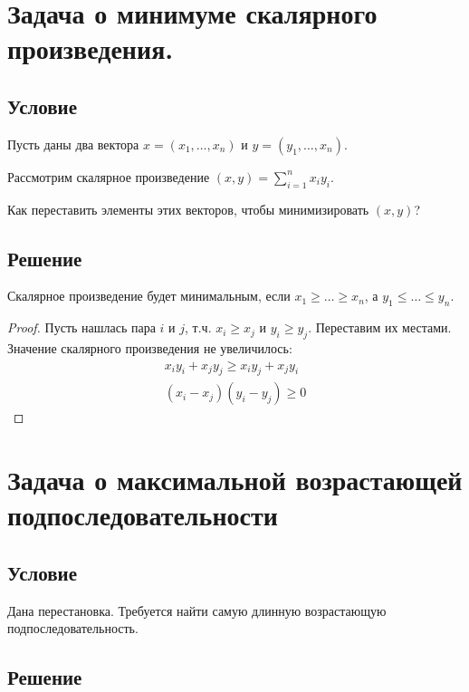 \documentclass[main]{subfiles}
\begin{document}
\section{Задача о минимуме скалярного произведения.}
\subsection{Условие}
Пусть даны два вектора $x = (x_1, \ldots, x_n)$ и $y = (y_1, \ldots, x_n)$.

Рассмотрим скалярное произведение $(x, y) = \sum_{i=1}^n x_iy_i$.

Как переставить элементы этих векторов, чтобы минимизировать $(x,y)$?

\subsection{Решение}
\begin{theorem}
    Скалярное произведение будет минимальным, если $x_1 \geq \ldots \geq x_n$,
    а $y_1 \leq \ldots \leq y_n$.
\end{theorem}

\begin{proof}
    Пусть нашлась пара $i$ и $j$, т.ч. $x_i \geq x_j$ и $y_i \geq y_j$.
    Переставим их местами. Значение скалярного произведения не увеличилось:
    \begin{align*}
        x_iy_i + x_jy_j \geq x_iy_j + x_jy_i \\
        (x_i - x_j)(y_i - y_j) \geq 0
    \end{align*}
\end{proof}

\section{Задача о максимальной возрастающей подпоследовательности}
\subsection{Условие}
Дана перестановка. Требуется найти самую длинную возрастающую 
подпоследовательность.

\subsection{Решение}
\end{document}
